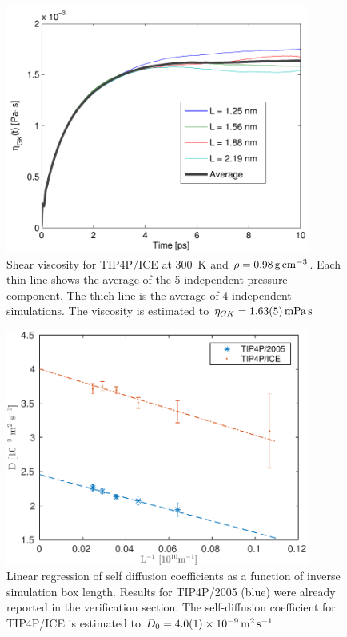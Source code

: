 \begin{figure}
\centering
\includegraphics[width=10cm]{../figures/thesis/viscosity_green_kubo_tip4p_ice.pdf}
\caption{Shear viscosity for TIP4P/ICE at \SI{300}{\kelvin} and $\rho = \text{\SI{0.98}{\gram\per\cubic\cm}}$. Each thin line shows the average of the 5 independent pressure component. The thich line is the average of 4 independent simulations. The viscosity is estimated to $\eta_{GK} = \text{\SI{1.63\pm0.05}{\milli\pascal\second}}$}
\label{fig:viscosity_green_kubo_tip4p_ice}
\end{figure}

\begin{figure}
\centering
\includegraphics[width=10cm]{../figures/thesis/diffusivity_comparison_tip4p_ice_2005.pdf}
\caption{Linear regression of self diffusion coefficients as a function of inverse simulation box length. Results for TIP4P/2005 (blue) were already reported in the verification section. The self-diffusion coefficient for TIP4P/ICE is estimated to $D_0 = \SI{4.0 \pm 0.1 d-9}{\meter\squared\per\second}$}
\label{fig:diffusivity_comparison_tip4p_ice_2005}
\end{figure}

